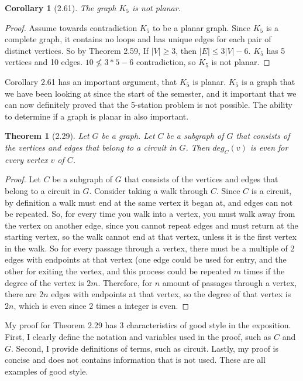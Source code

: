 \documentclass{article}
\newtheorem*{thm}{Theorem}
\newtheorem*{cor}{Corollary}
\begin{document}
\begin{description}
		\begin{cor}[2.61]
		  	The graph $K_5$ is not planar.
		\end{cor}
		\begin{proof}
			Assume towards contradiction $K_5$ to be a planar graph. Since $K_5$ is a complete graph, it contains no loops and 
			has unique edges for each pair of distinct vertices. So by Theorem 2.59, If $|V| \geq 3$, then $|E| \leq 3|V| - 6.$
			$K_5$ has 5 vertices and 10 edges. $10 \nleq 3*5 - 6$ contradiction, so $K_5$ is not planar. 
		\end{proof}
	
		Corollary 2.61 has an important argument, that $K_5$ is planar. $K_5$ is a graph that we have been looking at since the
		start of the semester, and it important that we can now definitely proved that the 5-station problem is not possible. The ability
		to determine if a graph is planar in also important. 

		\begin{thm}[2.29]
		  	Let $G$ be a graph. Let $C$ be a subgraph of $G$ that consists of the vertices and edges that belong to a circuit in $G$. Then $deg_C(v)$ is 
			even for every vertex $v$ of $C$.
	       \end{thm}
	       \begin{proof}
			 Let $C$ be a subgraph of $G$ that consists of the vertices and edges that belong to a circuit in $G$.
			 Consider taking a walk through $C$. Since $C$ is a circuit, by definition a walk must end at the same vertex it began at, and
			 edges can not be repeated. So, for every time you walk into a vertex, 
		 	 you must walk away from the vertex on another edge, since you cannot repeat edges and must return at the starting vertex, so
			 the walk cannot end at that vertex, unless it is the first vertex in the walk. 
			 So for every passage through a vertex, there  must be a multiple of  
			 2 edges with endpoints at that vertex (one edge could be used for entry, and the other for exiting the vertex, and 
			 this process could be repeated $m$ times if the degree of the vertex is $2m$.
			 Therefore, for $n$ amount of passages through a vertex, 
			 there are $2n$ edges with endpoints at that vertex, so the degree of that vertex is $2n$, which is even since 2 times a 
			 integer is even.
		\end{proof}
						       
		My proof for Theorem 2.29 has 3 characteristics of good style in the exposition. First, I clearly define the notation and variables
		used in the proof, such as $C$ and $G$. Second, I provide definitions of terms, such as circuit. Lastly, my proof is concise and
		does not contains information that is not used. These are all examples of good style. 

\end{description}
\end{document}
